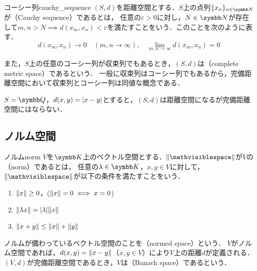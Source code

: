 \documentclass[../../main]{subfiles}
\begin{document}
\begin{definition}{コーシー列}{cauchy_sequence}
  \((S,d)\)を距離空間とする．\(S\)上の点列\(\seq{x_n}_{n\in\numset{N}}\)が（Cauchy sequence）であるとは，
  任意の\(\varepsilon>0\)に対し，\(N\in\numset{N}\)が存在して\(m,n>N\implies d(x_m,x_n)<\varepsilon\)を満たすことをいう．このことを次のように表す．
  \[
    d(x_m,x_n) \to 0\quad(m,n\to\infty),
    \quad\lim_{m,n\to\infty}d(x_m,x_n) = 0
  \]
\end{definition}

また，\(S\)上の任意のコーシー列が収束列でもあるとき，\((S,d)\)は（complete metric space）であるという．
一般に収束列はコーシー列でもあるから，完備距離空間において収束列とコーシー列は同値な概念である．

\begin{example}
  \(S=\numset{Q}\)，\(d(x,y)=\lvert x-y\rvert\)とすると，\((S,d)\)は距離空間になるが完備距離空間にはならない．
\end{example}

\subsection{ノルム空間}

\begin{definition}{ノルム}{norm}\indexsymbol{\(\vnorm{\holder}\)}
  \(V\)を\(\numset{K}\)上のベクトル空間とする．\(\vnorm{\holder}\)が\(V\)の（norm）であるとは，
  任意の\(\lambda\in\numset{K}\)，\(x,y\in V\)に対して，\(\vnorm{\holder}\)が以下の条件を満たすことをいう．
  \begin{enumerate}
    \item \(\lVert x\rVert\geq 0\)，(\(\lVert x\rVert=0\iff x=0\))
    \item \(\lVert\lambda x\rVert=\lvert\lambda\rvert\lVert x\rVert\)
    \item \(\lVert x+y\rVert\leq\lVert x\rVert+\lVert y\rVert\)
  \end{enumerate}
\end{definition}

ノルムが備わっているベクトル空間のことを（normed space）という．
\(V\)がノルム空間であれば，\(d(x,y)=\lVert x-y\rVert\)（\(x,y\in V\)）により\(V\)上の距離\(d\)が定義される．
\((V,d)\)が完備距離空間であるとき，\(V\)は（Banach space）であるという．
\end{document}
